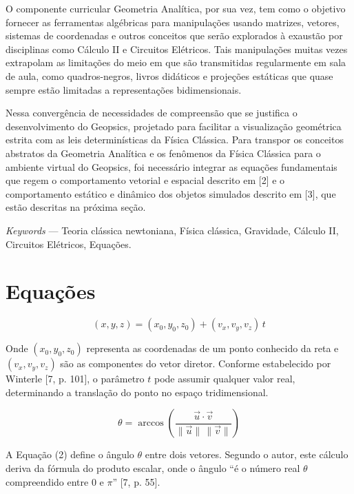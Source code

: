 \documentclass[conference,a4paper]{IEEEtran}
\begin{document}
O componente curricular Geometria Analítica, por sua vez, tem como o objetivo fornecer as ferramentas algébricas para manipulações usando matrizes, vetores, sistemas de coordenadas e outros conceitos que serão explorados à exaustão por disciplinas como Cálculo II e Circuitos Elétricos. Tais manipulações muitas vezes extrapolam as limitações do meio em que são transmitidas regularmente em sala de aula, como quadros-negros, livros didáticos e projeções estáticas que quase sempre estão limitadas a representações bidimensionais.

Nessa convergência de necessidades de compreensão que se justifica o desenvolvimento do Geopsics, projetado para facilitar a visualização geométrica estrita com as leis determinísticas da Física Clássica. Para transpor os conceitos abstratos da Geometria Analítica e os fenômenos da Física Clássica para o ambiente virtual do Geopsics, foi necessário integrar as equações fundamentais que regem o comportamento vetorial e espacial descrito em [2] e o comportamento estático e dinâmico dos objetos simulados descrito em [3], que estão descritas na próxima seção.

\textit{Keywords} --- Teoria clássica newtoniana, Física clássica, Gravidade, Cálculo II, Circuitos Elétricos, Equações.

\section{Equações}

\begin{equation}
(x,y,z) = (x_0,y_0,z_0) + (v_x,v_y,v_z)\,t \tag{1}
\end{equation}

Onde $(x_0, y_0, z_0)$ representa as coordenadas de um ponto conhecido da reta e $(v_x, v_y, v_z)$ são as componentes do vetor diretor. Conforme estabelecido por Winterle [7, p. 101], o parâmetro $t$ pode assumir qualquer valor real, determinando a translação do ponto no espaço tridimensional.

\begin{equation}
\theta = \arccos\!\left(\frac{\vec{u}\cdot\vec{v}}{\lVert \vec{u}\rVert\,\lVert \vec{v}\rVert}\right) \tag{2}
\end{equation}

A Equação (2) define o ângulo $\theta$ entre dois vetores. Segundo o autor, este cálculo deriva da fórmula do produto escalar, onde o ângulo ``é o número real $\theta$ compreendido entre $0$ e $\pi$'' [7, p. 55].
\end{document}
